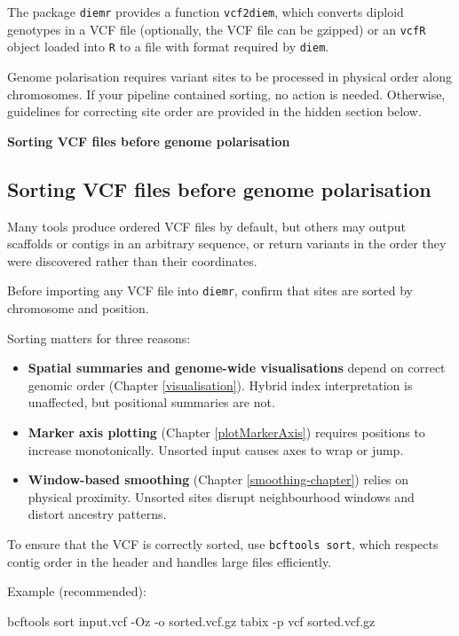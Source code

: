 \documentclass[
]{book}
\newenvironment{Shaded}{\begin{snugshade}}{\end{snugshade}}
\newcommand{\NormalTok}[1]{#1}
\providecommand{\tightlist}{%
  \setlength{\itemsep}{0pt}\setlength{\parskip}{0pt}}
\begin{document}
The package \texttt{diemr} provides a function \texttt{vcf2diem}, which converts diploid genotypes in a VCF file (optionally, the VCF file can be gzipped) or an \texttt{vcfR} object loaded into \texttt{R} to a file with format required by \texttt{diem}.

Genome polarisation requires variant sites to be processed in physical order along chromosomes. If your pipeline contained sorting, no action is needed. Otherwise, guidelines for correcting site order are provided in the hidden section below.

\textbf{Sorting VCF files before genome polarisation}

\subsection{Sorting VCF files before genome polarisation}\label{sorting-vcf-files-before-genome-polarisation}

Many tools produce ordered VCF files by default, but others may output scaffolds or contigs in an arbitrary sequence, or return variants in the order they were discovered rather than their coordinates.

Before importing any VCF file into \texttt{diemr}, confirm that sites are sorted by chromosome and position.

Sorting matters for three reasons:

\begin{itemize}
\tightlist
\item
  \textbf{Spatial summaries and genome-wide visualisations} depend on correct genomic order (Chapter \ref{visualisation}). Hybrid index interpretation is unaffected, but positional summaries are not.
\item
  \textbf{Marker axis plotting} (Chapter \ref{plotMarkerAxis}) requires positions to increase monotonically. Unsorted input causes axes to wrap or jump.
\item
  \textbf{Window-based smoothing} (Chapter \ref{smoothing-chapter}) relies on physical proximity. Unsorted sites disrupt neighbourhood windows and distort ancestry patterns.
\end{itemize}

To ensure that the VCF is correctly sorted, use \texttt{bcftools\ sort}, which respects contig order in the header and handles large files efficiently.

Example (recommended):

\begin{Shaded}
\begin{Highlighting}[]
\NormalTok{bcftools sort input.vcf {-}Oz {-}o sorted.vcf.gz}
\NormalTok{tabix {-}p vcf sorted.vcf.gz}
\end{Highlighting}
\end{Shaded}
\end{document}
